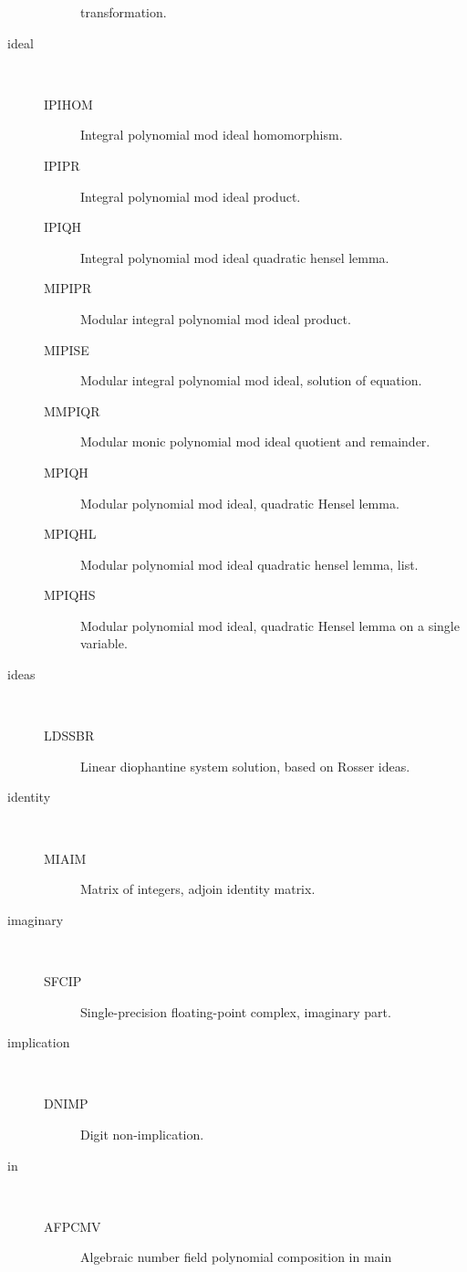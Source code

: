 \begin{description}
\begin{description}
    transformation.
  \end{description}
\item[ideal] \ \ 
  \begin{description}
  \item[IPIHOM]  Integral polynomial mod ideal homomorphism.
  \item[IPIPR]  Integral polynomial mod ideal product.
  \item[IPIQH]  Integral polynomial mod ideal quadratic hensel lemma.
  \item[MIPIPR]  Modular integral polynomial mod ideal product.
  \item[MIPISE]  Modular integral polynomial mod ideal, solution of equation.
  \item[MMPIQR]  Modular monic polynomial mod ideal quotient and remainder.
  \item[MPIQH]  Modular polynomial mod ideal, quadratic Hensel lemma.
  \item[MPIQHL]  Modular polynomial mod ideal quadratic hensel lemma, list.
  \item[MPIQHS]  Modular polynomial mod ideal, quadratic Hensel lemma on a
    single variable.
  \end{description}
\item[ideas] \ \ 
  \begin{description}
  \item[LDSSBR]  Linear diophantine system solution, based on Rosser ideas.
  \end{description}
\item[identity] \ \ 
  \begin{description}
  \item[MIAIM]  Matrix of integers, adjoin identity matrix.
  \end{description}
\item[imaginary] \ \ 
  \begin{description}
  \item[SFCIP]  Single-precision floating-point complex, imaginary part.
  \end{description}
\item[implication] \ \ 
  \begin{description}
  \item[DNIMP]  Digit non-implication.
  \end{description}
\item[in] \ \ 
  \begin{description}
  \item[AFPCMV]  Algebraic number field polynomial composition in main

\end{description}
\end{description}
